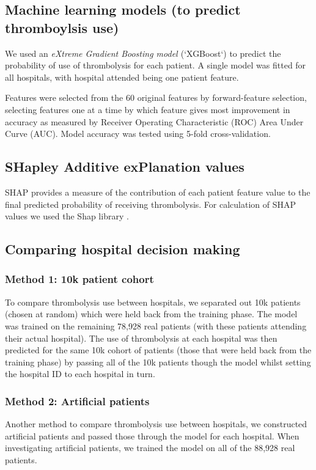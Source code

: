 \subsection{Machine learning models (to predict thromboylsis use)}

We used an \emph{eXtreme Gradient Boosting model \cite{chen_xgboost_2016}} (`XGBoost`) to predict the probability of use of thrombolysis for each patient. A single model was fitted for all hospitals, with hospital attended being one patient feature.

Features were selected from the 60 original features by forward-feature selection, selecting features one at a time by which feature gives most improvement in accuracy as measured by Receiver Operating Characteristic (ROC) Area Under Curve (AUC). Model accuracy was tested using 5-fold cross-validation.

\subsection{SHapley Additive exPlanation values}

SHAP provides a measure of the contribution of each patient feature value to the final predicted probability of receiving thrombolysis. For calculation of SHAP values we used the Shap library \cite{lundberg_unified_2017}.

\subsection{Comparing hospital decision making}
\subsubsection{Method 1: 10k patient cohort}
To compare thrombolysis use between hospitals, we separated out 10k patients (chosen at random) which were held back from the training phase. The model was trained on the remaining 78,928 real patients (with these patients attending their actual hospital). The use of thrombolysis at each hospital was then predicted for the same 10k cohort of patients (those that were held back from the training phase) by passing all of the 10k patients though the model whilst setting the hospital ID to each hospital in turn.

\subsubsection{Method 2: Artificial patients}
Another method to compare thrombolysis use between hospitals, we constructed artificial patients and passed those through the model for each hospital. When investigating artificial patients, we trained the model on all of the 88,928 real patients. 
